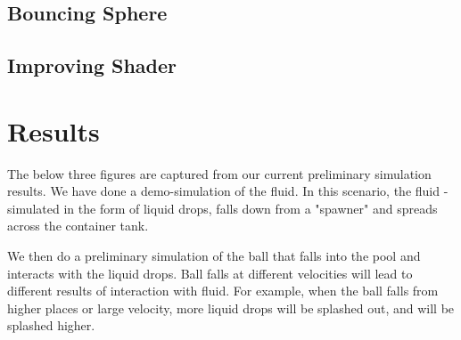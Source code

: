 \documentclass{article}
\begin{document}
\subsection{Bouncing Sphere}


\subsection{Improving Shader}

\section{Results}

\hspace*{1em}The below three figures are captured from our current preliminary simulation results. We have done a demo-simulation of the fluid. In this scenario, the fluid - simulated in the form of liquid drops, falls down from a "spawner" and spreads across the container tank. 

\noindent\hspace*{1em} We then do a preliminary simulation of the ball that falls into the pool and interacts with the liquid drops. Ball falls at different velocities will lead to different results of interaction with fluid. For example, when the ball falls from higher places or large velocity, more liquid drops will be splashed out, and will be splashed higher. 
\end{document}

